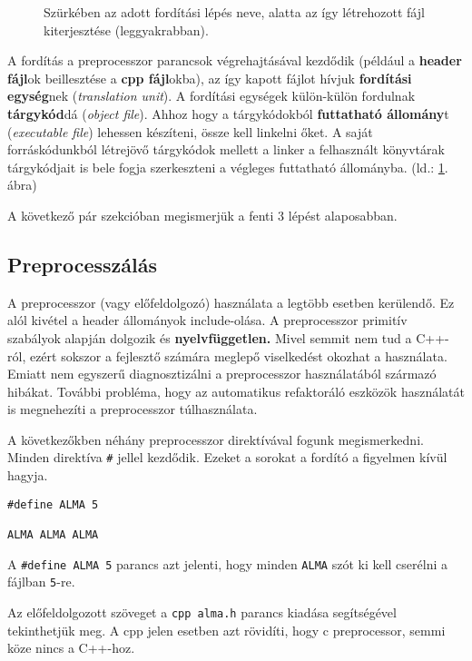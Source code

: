 \documentclass[../cpp_book/cpp_book.tex]{subfiles}
\begin{document}
	\begin{figure}[!h]
		\centering
		
		
		\smallskip
		\caption{Szürkében az adott fordítási lépés neve, alatta az így létrehozott fájl kiterjesztése (leggyakrabban).}\label{steps_of_compilation}
	\end{figure}
	A fordítás a preprocesszor parancsok végrehajtásával kezdődik (például a \textbf{header fájl}ok beillesztése a \textbf{cpp fájl}okba), az így kapott fájlot hívjuk \textbf{fordítási egység}nek (\textit{translation unit}). A fordítási egységek külön-külön fordulnak \textbf{tárgykód}dá (\textit{object file}). Ahhoz hogy a tárgykódokból \textbf{futtatható állomány}t (\textit{executable file}) lehessen készíteni, össze kell linkelni őket. A saját forráskódunkból létrejövő tárgykódok mellett a linker a felhasznált könyvtárak tárgykódjait is bele fogja szerkeszteni a végleges futtatható állományba. (ld.: \ref{steps_of_compilation}. ábra)
	\medskip
	
	A következő pár szekcióban megismerjük a fenti 3 lépést alaposabban.
	
	\subsection{Preprocesszálás}
	A preprocesszor (vagy előfeldolgozó) használata a legtöbb esetben kerülendő. Ez alól kivétel a header állományok include-olása. A preprocesszor primitív szabályok alapján dolgozik és \textbf{nyelvfüggetlen.} Mivel semmit nem tud a C++-ról, ezért sokszor a fejlesztő számára meglepő viselkedést okozhat a használata. Emiatt nem egyszerű diagnosztizálni a preprocesszor használatából származó hibákat. További probléma, hogy az automatikus refaktoráló eszközök használatát is megnehezíti a preprocesszor túlhasználata.
	
	A következőkben néhány preprocesszor direktívával fogunk megismerkedni. Minden direktíva \texttt{\#} jellel kezdődik. Ezeket a sorokat a fordító a figyelmen kívül hagyja.
  \bigskip
	
	\begin{lstlisting}
#define ALMA 5

ALMA ALMA ALMA
	\end{lstlisting}
	A \texttt{\#define ALMA 5}  parancs azt jelenti, hogy minden \texttt{ALMA} szót ki kell cserélni a fájlban \texttt{5}-re.
	
	Az előfeldolgozott szöveget a \texttt{cpp alma.h} parancs kiadása segítségével tekinthetjük meg. A cpp jelen esetben azt rövidíti, hogy c preprocessor, semmi köze nincs a C++-hoz.
	
\end{document}
